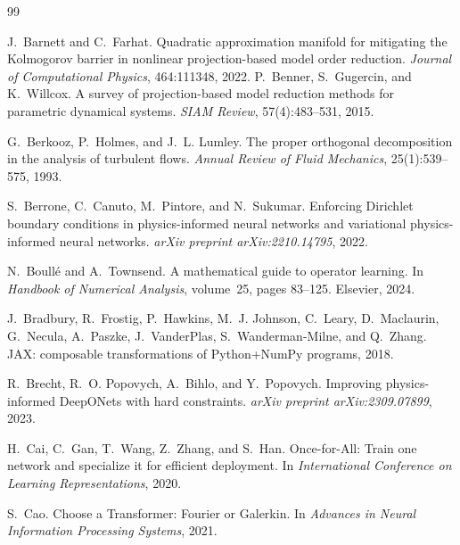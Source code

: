 \documentclass{article}
\begin{document}

\begin{thebibliography}{99}

J.~Barnett and C.~Farhat.
\newblock Quadratic approximation manifold for mitigating the
Kolmogorov barrier in nonlinear projection-based model order reduction.
\newblock \emph{Journal of Computational Physics}, 464:111348, 2022.
P.~Benner, S.~Gugercin, and K.~Willcox.
\newblock A survey of projection-based model reduction methods for
parametric dynamical systems.
\newblock \emph{SIAM Review}, 57(4):483--531, 2015.

G.~Berkooz, P.~Holmes, and J.~L. Lumley.
\newblock The proper orthogonal decomposition in the analysis of
turbulent flows.
\newblock \emph{Annual Review of Fluid Mechanics}, 25(1):539--575, 1993.

S.~Berrone, C.~Canuto, M.~Pintore, and N.~Sukumar.
\newblock Enforcing Dirichlet boundary conditions in physics-informed
neural networks and variational physics-informed neural networks.
\newblock \emph{arXiv preprint arXiv:2210.14795}, 2022.

N.~Boull\'e and A.~Townsend.
\newblock A mathematical guide to operator learning.
\newblock In \emph{Handbook of Numerical Analysis}, volume~25, pages
83--125. Elsevier, 2024.

J.~Bradbury, R.~Frostig, P.~Hawkins, M.~J. Johnson, C.~Leary,
D.~Maclaurin, G.~Necula, A.~Paszke, J.~VanderPlas, S.~Wanderman-Milne,
and Q.~Zhang.
\newblock JAX: composable transformations of Python+NumPy programs, 2018.

R.~Brecht, R.~O. Popovych, A.~Bihlo, and Y.~Popovych.
\newblock Improving physics-informed DeepONets with hard constraints.
\newblock \emph{arXiv preprint arXiv:2309.07899}, 2023.

H.~Cai, C.~Gan, T.~Wang, Z.~Zhang, and S.~Han.
\newblock Once-for-All: Train one network and specialize it for
efficient deployment.
\newblock In \emph{International Conference on Learning Representations},
2020.

S.~Cao.
\newblock Choose a Transformer: Fourier or Galerkin.
\newblock In \emph{Advances in Neural Information Processing Systems},
2021.


\end{thebibliography}
\end{document}
